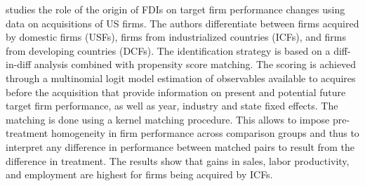 \cite{chen2011} studies the role of the origin of FDIs on target firm performance changes using data on acquisitions of US firms. The authors differentiate between firms acquired by domestic firms (USFs), firms from industrialized countries (ICFs), and firms from developing countries (DCFs). The identification strategy is based on a diff-in-diff analysis combined with propensity score matching. The scoring is achieved through a multinomial logit model estimation of observables available to acquires before the acquisition that provide information on present and potential future target firm performance, as well as year, industry and state fixed effects. The matching is done using a kernel matching procedure. This allows to impose pre-treatment homogeneity in firm performance across comparison groups and thus to interpret any difference in performance between matched pairs to result from the difference in treatment. The results show that gains in sales, labor productivity, and employment are highest for firms being acquired by ICFs.
